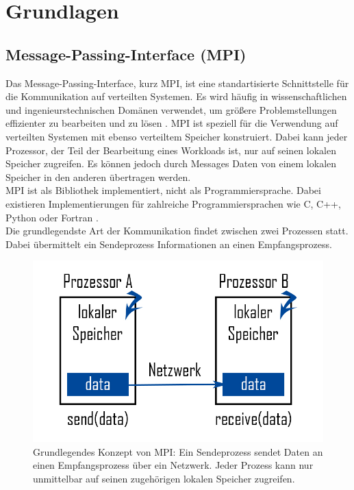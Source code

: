 \documentclass[doktyp=semarbeit, sprache=german]{TUBAFarbeiten}
\begin{document}
\section{Grundlagen}
\subsection{Message-Passing-Interface (MPI)}
Das Message-Passing-Interface, kurz MPI, ist eine standartisierte Schnittstelle für die Kommunikation auf verteilten Systemen. Es wird häufig in wissenschaftlichen und ingenieurstechnischen Domänen verwendet, um größere Problemstellungen effizienter zu bearbeiten und zu lösen \cite{MPIBook}. MPI ist speziell für die Verwendung auf verteilten Systemen mit ebenso verteiltem Speicher konstruiert. Dabei kann jeder Prozessor, der Teil der Bearbeitung eines Workloads ist, nur auf seinen lokalen Speicher zugreifen. Es können jedoch durch Messages Daten von einem lokalen Speicher in den anderen übertragen werden.
\\MPI ist als Bibliothek implementiert, nicht als Programmiersprache. Dabei existieren Implementierungen für zahlreiche Programmiersprachen wie C, C++, Python oder Fortran \cite{ScriptPC}.
\\Die grundlegendste Art der Kommunikation findet zwischen zwei Prozessen statt. Dabei übermittelt ein Sendeprozess Informationen an einen Empfangsprozess.
\begin{figure}
	\centering
	\captionsetup{justification=centering} 
	\includegraphics[width=1.0\textwidth]{images/MPIModell.jpg}
	\caption{Grundlegendes Konzept von MPI: Ein Sendeprozess sendet Daten an einen Empfangsprozess über ein Netzwerk. Jeder Prozess kann nur unmittelbar auf seinen zugehörigen lokalen Speicher zugreifen.}
	\label{img:mpimodell}
\end{figure}
\end{document}
